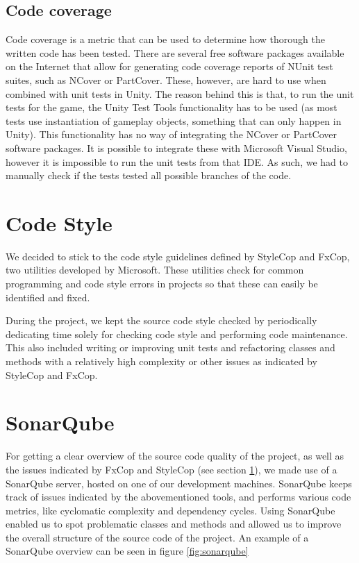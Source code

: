 		\subsection{Code coverage} \label{ssec:codecoverage}
			Code coverage is a metric that can be used to determine how thorough
			the written code has been tested. There are several free software
			packages available on the Internet that allow for generating code
			coverage reports of NUnit test suites, such as NCover or PartCover.
			These, however, are hard to use when combined with unit tests in
			Unity. The reason behind this is that, to run the unit tests for
			the game, the Unity Test Tools functionality has to be used (as most
			tests use instantiation of gameplay objects, something that can
			only happen in Unity). This functionality has no way of integrating
			the NCover or PartCover software packages. It is possible to integrate
			these with Microsoft Visual Studio, however it is impossible to run
			the unit tests from that IDE. As such, we had to manually check
			if the tests tested all possible branches of the code.
			
	\section{Code Style} \label{sec:codestyle}
		We decided to stick to the code style guidelines defined by StyleCop and 
		FxCop, two utilities developed by Microsoft. These utilities check for 
		common programming and code style errors in projects so that these can 
		easily be identified and fixed. 
		
		During the project, we kept the source code style checked by periodically
		dedicating time solely for checking code style and performing code 
		maintenance. This also included writing or improving unit tests and 
		refactoring classes and methods with a relatively high complexity or other 
		issues as indicated by StyleCop and FxCop.
		
	\section{SonarQube} \label{sec:sonarqube}
		For getting a clear overview of the source code quality of the project, as 
		well as the issues indicated by FxCop and StyleCop (see section 
		\ref{sec:codestyle}), we made use of a SonarQube server, hosted on one of 
		our development machines. SonarQube keeps track of issues indicated by 
		the abovementioned tools, and performs various code metrics, like cyclomatic 
		complexity and dependency cycles. Using SonarQube enabled us to spot 
		problematic classes and methods and allowed us to improve the overall 
		structure of the source code of the project. An example of a SonarQube
		overview can be seen in figure \ref{fig:sonarqube}
		
